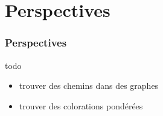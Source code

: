 \documentclass{beamer}
\begin{document}
\section{Perspectives}

\begin{frame}
    \frametitle{Perspectives}
    todo
    \begin{itemize}
        \item trouver des chemins dans des graphes
        \item trouver des colorations pondérées
    \end{itemize}
\end{frame}
\end{document}
